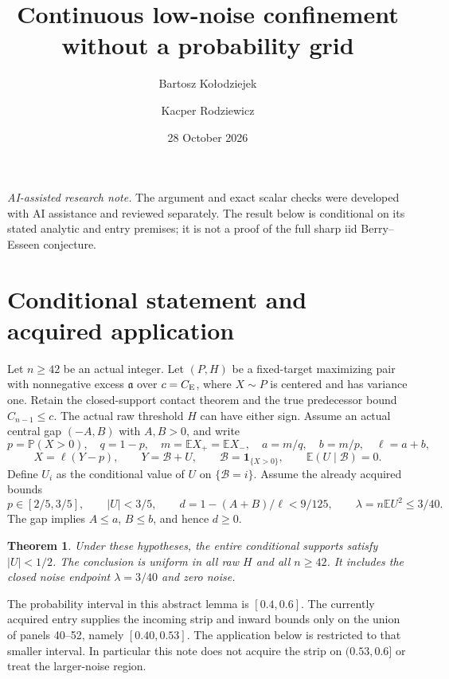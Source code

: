 \documentclass[11pt]{article}
\title{Continuous low-noise confinement without a probability grid}
\author{Bartosz Ko\l{}odziejek \and Kacper Rodziewicz}\date{28 October 2026}
\newcommand{\E}{\mathbb E}\newcommand{\Pp}{\mathbb P}
\newcommand{\CE}{C_{\rm E}}
\newtheorem{theorem}{Theorem}\newtheorem{corollary}{Corollary}
\begin{document}
\maketitle
\noindent\textit{AI-assisted research note.} The argument and exact scalar
checks were developed with AI assistance and reviewed separately. The
result below is conditional on its stated analytic and entry premises;
it is not a proof of the full sharp iid Berry--Esseen conjecture.

\section{Conditional statement and acquired application}
Let $n\ge42$ be an actual integer. Let $(P,H)$ be a fixed-target maximizing
pair with nonnegative excess $\mathfrak a$ over $c=\CE$, where $X\sim P$
is centered and has variance one. Retain the closed-support contact theorem
and the true predecessor bound $C_{n-1}\le c$. The actual raw threshold
$H$ can have either sign. Assume an actual central gap $(-A,B)$ with
$A,B>0$, and write
\[
 p=\Pp(X>0),\quad q=1-p,\quad m=\E X_+=\E X_-,\quad
 a=m/q,\quad b=m/p,\quad \ell=a+b,
\]
\[
 X=\ell(Y-p),\qquad Y=\mathcal B+U,\qquad
 \mathcal B=\mathbf1_{\{X>0\}},\qquad \E(U\mid\mathcal B)=0.
\]
Define $U_i$ as the conditional value of $U$ on $\{\mathcal B=i\}$.
Assume the already acquired bounds
\begin{equation}\label{ln:entry}
 p\in[2/5,3/5],\qquad |U|<3/5,\qquad
 d=1-(A+B)/\ell<9/125,
 \qquad \lambda=n\E U^2\le3/40.
\end{equation}
The gap implies $A\le a$, $B\le b$, and hence $d\ge0$.

\begin{theorem}\label{ln:theorem}
Under these hypotheses, the entire conditional supports satisfy
$|U|<1/2$. The conclusion is uniform in all raw $H$ and all $n\ge42$.
It includes the closed noise endpoint $\lambda=3/40$ and zero noise.
\end{theorem}

The probability interval in this abstract lemma is $[0.4,0.6]$.
The currently acquired entry supplies the incoming strip and inward bounds
only on the union of panels 40--52, namely $[0.40,0.53]$. The application
below is restricted to that smaller interval. In particular this note
does not acquire the strip on $(0.53,0.6]$ or treat the larger-noise region.
\end{document}
